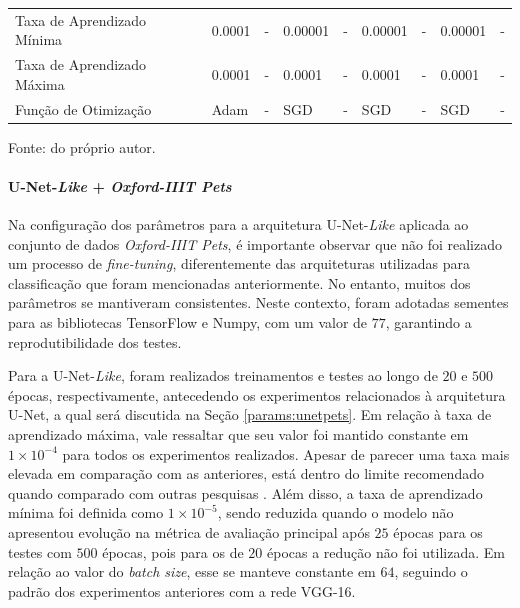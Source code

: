 \begin{table}[H]
{\begin{tabular}{l|l|l|l|l|l|l|l|l}
            Taxa de Aprendizado Mínima                   & 0.0001                             & -                       & 0.00001                            & -                       & 0.00001                            & -                       & 0.00001                            & -                                                                  \\
            Taxa de Aprendizado Máxima                   & 0.0001                             & -                       & 0.0001                             & -                       & 0.0001                             & -                       & 0.0001                             & -                                                                  \\
            Função de Otimização                         & Adam                               & -                       & SGD                                & -                       & SGD                                & -                       & SGD                                & -                       
        \end{tabular}
        }

    \vspace*{1 cm}
    Fonte: do próprio autor.
\end{table}


\paragraph{U-Net-\textit{Like} + \textit{Oxford-IIIT Pets}}
\label{params:unetlikepets}
Na configuração dos parâmetros para a arquitetura U-Net-\textit{Like} aplicada ao conjunto de dados \textit{Oxford-IIIT Pets}, é importante observar que não foi realizado um processo de \textit{fine-tuning}, diferentemente das arquiteturas utilizadas para classificação que foram mencionadas anteriormente. No entanto, muitos dos parâmetros se mantiveram consistentes. Neste contexto, foram adotadas sementes para as bibliotecas TensorFlow e Numpy, com um valor de $77$, garantindo a reprodutibilidade dos testes.

Para a U-Net-\textit{Like}, foram realizados treinamentos e testes ao longo de $20$ e $500$ épocas, respectivamente, antecedendo os experimentos relacionados à arquitetura U-Net, a qual será discutida na Seção \ref{params:unetpets}. Em relação à taxa de aprendizado máxima, vale ressaltar que seu valor foi mantido constante em $1 \times 10^{-4}$ para todos os experimentos realizados. Apesar de parecer uma taxa mais elevada em comparação com as anteriores, está dentro do limite recomendado quando comparado com outras pesquisas \citep{Fajar2023CyclicalSegmentation}. Além disso, a taxa de aprendizado mínima foi definida como $1 \times 10^{-5}$, sendo reduzida quando o modelo não apresentou evolução na métrica de avaliação principal após $25$ épocas para os testes com $500$ épocas, pois para os de $20$ épocas a redução não foi utilizada. Em relação ao valor do \textit{batch size}, esse se manteve constante em $64$, seguindo o padrão dos experimentos anteriores com a rede VGG-16.

